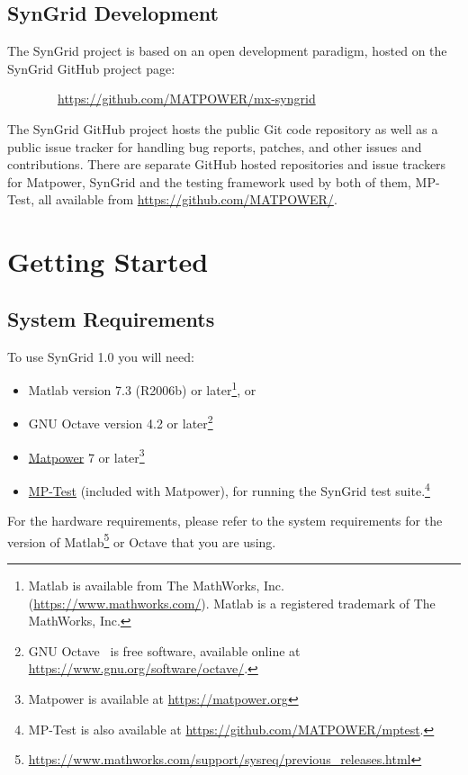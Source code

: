 \documentclass[12pt]{article}
\newcommand{\matlab}[0]{{\sc Matlab}}
\newcommand{\matpower}[0]{{\sc Matpower}}
\newcommand{\matpowerurl}[0]{https://matpower.org}
\newcommand{\matpowerlink}[0]{\href{\matpowerurl}{\matpower{}}}
\newcommand{\mptest}[0]{{MP-Test}}
\newcommand{\mptesturl}[0]{https://github.com/MATPOWER/mptest}
\newcommand{\mptestlink}[0]{\href{\mptesturl}{\mptest{}}}
\newcommand{\syngrid}[0]{{SynGrid}}
\newcommand{\syngridver}[0]{1.0}
\newcommand{\syngridurl}[0]{https://github.com/MATPOWER/mx-syngrid}
\numberwithin{equation}{section}
\numberwithin{table}{section}
\numberwithin{figure}{section}
\begin{document}
\subsection{\syngrid{} Development}
\label{sec:development}

The \syngrid{} project is based on an open development paradigm, hosted on the \syngrid{} GitHub project page:

\bigskip

~~~~~~~~\url{\syngridurl}

\bigskip

The \syngrid{} GitHub project hosts the public Git code repository as well as a public issue tracker for handling bug reports, patches, and other issues and contributions. There are separate GitHub hosted repositories and issue trackers for \matpower{}, \syngrid{} and the testing framework used by both of them, \mptest{}, all available from \url{https://github.com/MATPOWER/}.


\section{Getting Started}

\subsection{System Requirements}
\label{sec:sysreq}
To use \syngrid{} \syngridver{} you will need:
\begin{itemize}
\item \matlab{}\textsuperscript{\tiny \textregistered} version 7.3 (R2006b) or later\footnote{\matlab{} is available from The MathWorks, Inc. (\url{https://www.mathworks.com/}). \matlab{} is a registered trademark of The MathWorks, Inc.}, or
\item GNU Octave version 4.2 or later\footnote{GNU Octave~\cite{octave} is free software, available online at \url{https://www.gnu.org/software/octave/}.}
\item \matpowerlink{} 7 or later\footnote{\matpower{} is available at \url{\matpowerurl}}
\item \mptestlink{} (included with \matpower{}), for running the \syngrid{} test suite.\footnote{\mptest{} is also available at \url{\mptesturl}.}
\end{itemize}

For the hardware requirements, please refer to the system requirements for the version of \matlab{}\footnote{\url{https://www.mathworks.com/support/sysreq/previous_releases.html}} or Octave that you are using.
\end{document}

